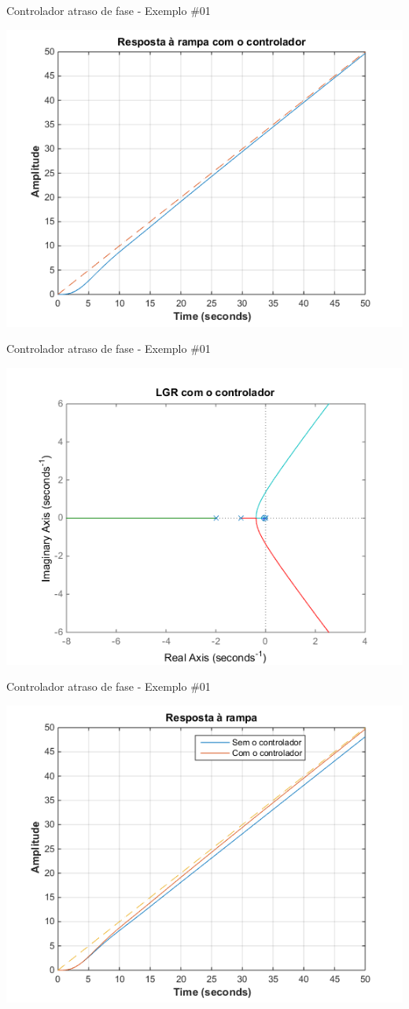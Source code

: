 \begin{frame}{Controlador atraso de fase - Exemplo \#01}
\centerline{\includegraphics[width=0.8\linewidth]{Figuras/Ch09/fig13.png}}
\end{frame}

\begin{frame}{Controlador atraso de fase - Exemplo \#01}
\centerline{\includegraphics[width=0.8\linewidth]{Figuras/Ch09/fig14.png}}
\end{frame}

\begin{frame}{Controlador atraso de fase - Exemplo \#01}
\centerline{\includegraphics[width=0.8\linewidth]{Figuras/Ch09/fig15.png}}
\end{frame}

